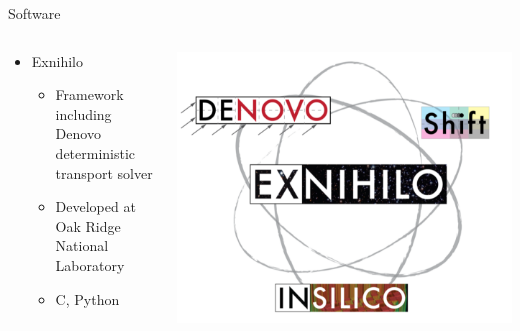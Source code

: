 \documentclass{beamer}
\newcommand{\cpp}{C\nolinebreak\hspace{-.05em}\raisebox{.4ex}{\tiny\bf +}\nolinebreak\hspace{-.10em}\raisebox{.4ex}{\tiny\bf +}}
\begin{document}
\begin{frame}{Software\nocite{denovo}}
%
\begin{columns}
\begin{column}{0.5\textwidth}
\begin{itemize}
\item{Exnihilo}
\begin{itemize}
\item{Framework including Denovo deterministic transport solver}
\item{Developed at Oak Ridge National Laboratory}
\item{\cpp, Python}
\end{itemize}
\end{itemize}
\end{column}
%
\begin{column}{0.5\textwidth}
\includegraphics[width=\textwidth,natwidth=932,natheight=754]{img/exnihilo.png}
\end{column}
\end{columns}
%
\end{frame}
\end{document}
